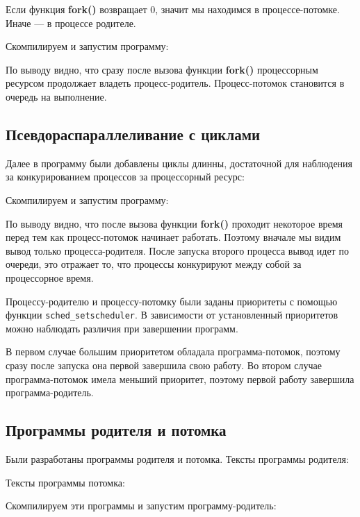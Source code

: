 \documentclass[a4paper]{article}
\begin{document}
	Если функция \textbf{fork()} возвращает 0, значит мы находимся в процессе-потомке. Иначе --- в процессе родителе.
	
	Скомпилируем и запустим программу:
	
	
	По выводу видно, что сразу после вызова функции \textbf{fork()} процессорным ресурсом продолжает владеть процесс-родитель. Процесс-потомок становится в очередь на выполнение.

\subsection{Псевдораспараллеливание с циклами}
	Далее в программу были добавлены циклы длинны, достаточной для наблюдения за конкурированием процессов за процессорный ресурс:
	

	Скомпилируем и запустим программу:
	
	
	По выводу видно, что после вызова функции \textbf{fork()} проходит некоторое время перед тем как процесс-потомок начинает работать. Поэтому вначале мы видим вывод только процесса-родителя. После запуска второго процесса вывод идет по очереди, это отражает то, что процессы конкурируют между собой за процессорное время.
	
	Процессу-родителю и процессу-потомку были заданы приоритеты с помощью функции \texttt{sched\_setscheduler}. В зависимости от установленный приоритетов можно наблюдать различия при завершении программ.
	
	
	В первом случае большим приоритетом обладала программа-потомок, поэтому сразу после запуска она первой завершила свою работу. Во втором случае программа-потомок имела меньший приоритет, поэтому первой работу завершила программа-родитель.
	
\subsection{Программы родителя и потомка}
	Были разработаны программы родителя и потомка. Тексты программы родителя:
	

	Тексты программы потомка:
	
	
	Скомпилируем эти программы и запустим программу-родитель:
	
	
\end{document}
